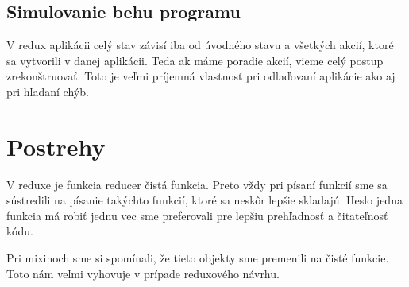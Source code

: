 \subsection{Simulovanie behu programu}
V redux aplikácii celý stav závisí iba od úvodného stavu a všetkých akcií, ktoré sa vytvorili v danej aplikácii. Teda ak máme poradie akcií, vieme celý postup zrekonštruovať. Toto je veľmi príjemná vlastnosť pri odlaďovaní aplikácie ako aj pri hľadaní chýb.

\section{Postrehy}
V reduxe je funkcia reducer čistá funkcia. Preto vždy pri písaní funkcií sme sa sústredili na písanie takýchto funkcií, ktoré sa neskôr lepšie skladajú. Heslo jedna funkcia má robiť jednu vec sme preferovali pre lepšiu prehľadnosť a čitateľnosť kódu.

Pri mixinoch sme si spomínali, že tieto objekty sme premenili na čisté funkcie. Toto nám veľmi vyhovuje v prípade reduxového návrhu.

